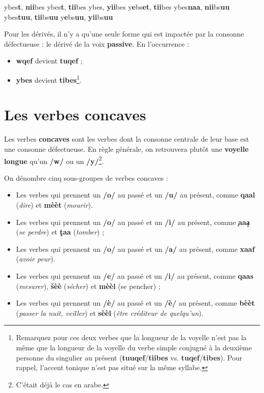     {ybes\textbf{t}, \textbf{nii}bes}
    {ybes\textbf{t}, \textbf{tii}bes}
    {ybes, \textbf{yii}bes}
    {y\textbf{e}bs\textbf{et}, \textbf{tii}bes}
    {ybes\textbf{naa}, \textbf{nii}bs\textbf{uu}}
    {ybes\textbf{tuu}, \textbf{tii}bs\textbf{uu}}
    {y\textbf{e}bs\textbf{uu}, \textbf{yii}bs\textbf{uu}}

Pour les dérivés, il n'y a qu'une seule forme qui est impactée par la consonne défectueuse : le dérivé de la voix \textbf{passive}. En l'occurrence : 
\begin{itemize}
    \item \textbf{wqef} devient \textbf{tuqef} ;
    \item \textbf{ybes} devient \textbf{tibes}\footnote{Remarquez pour ces deux verbes que la longueur de la voyelle n'est pas la même que la longueur de la voyelle du verbe simple conjugué à la deuxième personne du singulier au présent (\textbf{tuuqef}/\textbf{tiibes} vs. \textbf{tuqef}/\textbf{tibes}). Pour rappel, l'accent tonique n'est pas situé sur la même syllabe.}.
\end{itemize}

\section{Les verbes concaves}

Les verbes \textbf{concaves} sont les verbes dont la consonne centrale de leur base est une consonne défectueuse. En règle générale, on retrouvera plutôt une \textbf{voyelle longue} qu'un \textbf{/w/} ou un \textbf{/y/}\footnote{C'était déjà le cas en arabe.}.

On dénombre cinq sous-groupes de verbes concaves : 

\begin{itemize}
    \item Les verbes qui prennent un \textbf{/o/} au passé et un \textbf{/u/} au présent, comme \textbf{qaal} (\textit{dire}) et \textbf{mèèt} (\textit{mourir}).
    \item Les verbes qui prennent un \textbf{/o/} au passé et un \textbf{/i/} au présent, comme \textbf{\c{\dh}aa\c{a}} (\textit{se perdre}) et \textbf{\c{t}aa\textcrh} (\textit{tomber}) ;
    \item Les verbes qui prennent un \textbf{/o/} au passé et un \textbf{/a/} au présent, comme \textbf{xaaf} (\textit{avoir peur}).
    \item Les verbes qui prennent un \textbf{/e/} au passé et un \textbf{/i/} au présent, comme \textbf{qaas} (\textit{mesurer}), \textbf{\v{s}èè\textcrh} (\textit{sécher}) et \textbf{mèèl} (se pencher) ;
    \item Les verbes qui prennent un \textbf{/è/} au passé et un \textbf{/è/} au présent, comme \textbf{bèèt} (\textit{passer la nuit, veiller}) et \textbf{sèèl} (\textit{être créditeur de quelqu'un}).
\end{itemize}

